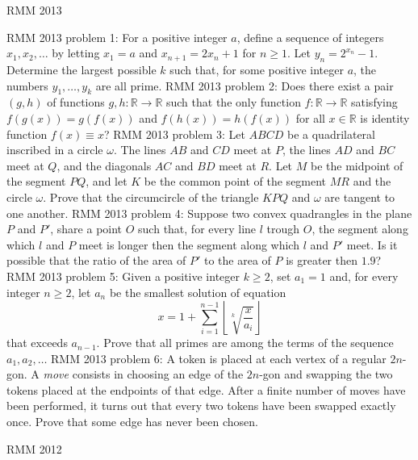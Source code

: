 RMM 2013 

RMM 2013 problem 1:  For a positive integer $a$, define a sequence of integers $x_1,x_2,\ldots$ by letting $x_1=a$ and $x_{n+1}=2x_n+1$ for $n\geq 1$. Let $y_n=2^{x_n}-1$. Determine the largest possible $k$ such that, for some positive integer $a$, the numbers $y_1,\ldots,y_k$ are all prime. 
RMM 2013 problem 2:  Does there exist a pair $(g,h)$ of functions $g,h:\mathbb{R}\rightarrow\mathbb{R}$ such that the only function $f:\mathbb{R}\rightarrow\mathbb{R}$ satisfying $f(g(x))=g(f(x))$ and $f(h(x))=h(f(x))$ for all $x\in\mathbb{R}$ is identity function $f(x)\equiv x$? 
RMM 2013 problem 3:  Let $ABCD$ be a quadrilateral inscribed in a circle $\omega$. The lines $AB$ and $CD$ meet at $P$, the lines $AD$ and $BC$ meet at $Q$, and the diagonals $AC$ and $BD$ meet at $R$. Let $M$ be the midpoint of the segment $PQ$, and let $K$ be the common point of the segment $MR$ and the circle $\omega$. Prove that the circumcircle of the triangle $KPQ$ and $\omega$ are tangent to one another. 
RMM 2013 problem 4:  Suppose two convex quadrangles in the plane $P$ and $P'$, share a point $O$ such that, for every line $l$ trough $O$, the segment along which $l$ and $P$ meet is longer then the segment along which $l$ and $P'$ meet. Is it possible that the ratio of the area of $P'$ to the area of $P$ is greater then $1.9$? 
RMM 2013 problem 5:  Given a positive integer $k\geq2$, set $a_1=1$ and, for every integer $n\geq 2$, let $a_n$ be the smallest solution of equation
\[ x=1+\sum_{i=1}^{n-1}\left\lfloor\sqrt[k]{\frac{x}{a_i}}\right\rfloor \]
that exceeds $a_{n-1}$. Prove that all primes are among the terms of the sequence $a_1,a_2,\ldots$ 
RMM 2013 problem 6:  A token is placed at each vertex of a regular $2n$-gon. A \textit{move} consists in choosing an edge of the $2n$-gon and swapping the two tokens placed at the endpoints of that edge. After a finite number of moves have been performed, it turns out that every two tokens have been swapped exactly once. Prove that some edge has never been chosen. 

RMM 2012 

